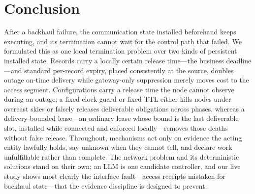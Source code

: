 \documentclass[11pt]{article}
\begin{document}
\section{Conclusion}
After a backhaul failure, the communication state installed beforehand keeps executing, and its
termination cannot wait for the control path that failed. We formulated this as one local
termination problem over two kinds of persistent installed state. Records carry a locally certain
release time---the business deadline---and standard per-record expiry, placed consistently at the
source, doubles outage on-time delivery while gateway-only suppression merely moves cost to the
access segment. Configurations carry a release time the node cannot observe during an outage; a
fixed clock guard or fixed TTL either kills nodes under overcast skies or falsely releases
deliverable obligations across phases, whereas a delivery-bounded lease---an ordinary lease whose
bound is the last deliverable slot, installed while connected and enforced locally---removes those
deaths without false release. Throughout, mechanisms act only on evidence the acting entity
lawfully holds, say unknown when they cannot tell, and declare work unfulfillable rather than
complete. The network problem and its deterministic solutions stand on their own; an LLM is one
candidate controller, and our live study shows most clearly the interface fault---access receipts
mistaken for backhaul state---that the evidence discipline is designed to prevent.



\end{document}
